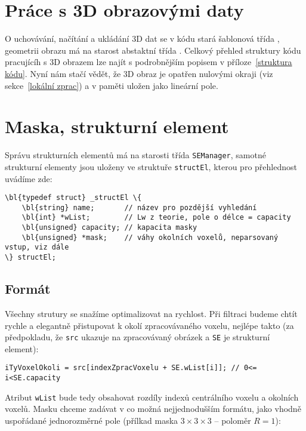     \section{Práce s 3D obrazovými daty}

    O uchovávání, načítání a ukládání 3D dat se v kódu stará šablonová třída \Imageman, geometrii obrazu má na starost abstaktní třída \Imageinfo. Celkový přehled struktury kódu pracujícíh s 3D obrazem lze najít s podrobnějším popisem v příloze~\ref{struktura kódu}. Nyní nám stačí vědět, že 3D obraz je opatřen nulovými okraji (viz sekce~\ref{lokální zprac}) a v paměti uložen jako lineární pole.
    
    \section{Maska, strukturní element}

    Správu strukturních elementů má na starosti třída {\tt SEManager}, samotné strukturní elementy jsou uloženy ve struktuře {\tt structEl}, kterou pro přehlednost uvádíme zde:

    \begin{Verbatim}[commandchars = \\\{\}]
\bl{typedef struct} _structEl \{
    \bl{string} name;       // název pro pozdější vyhledání
    \bl{int} *wList;        // Lw z teorie, pole o délce = capacity
    \bl{unsigned} capacity; // kapacita masky
    \bl{unsigned} *mask;    // váhy okolních voxelů, neparsovaný vstup, viz dále
\} structEl;
    \end{Verbatim}

    \subsection{Formát}

    Všechny strutury se snažíme optimalizovat na rychlost. Při filtraci budeme chtít rychle a elegantně přistupovat k okolí zpracovávaného voxelu, nejlépe takto (za předpokladu, že {\tt src} ukazuje na zpracovávaný obrázek a {\tt SE} je strukturní element):

    \begin{Verbatim}
iTyVoxelOkoli = src[indexZpracVoxelu + SE.wList[i]]; // 0<= i<SE.capacity
    \end{Verbatim}

    Atribut {\tt wList} bude tedy obsahovat rozdíly indexů centrálního voxelu a okolních voxelů. Masku chceme zadávat v co možná nejjednodušším formátu, jako vhodně uspořádané jednorozměrné pole (přílkad maska $3\times 3\times3$ -- poloměr $R = 1$):

